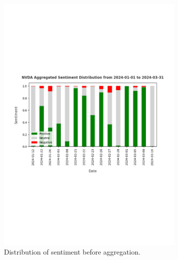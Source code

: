 \begin{figure}[htbp]
    \centering
    \begin{subfigure}{0.8\textwidth}
        \centering
        \includegraphics[width=\textwidth]{img/experiment-stock/nvda-preaggregated-a.pdf}
        \caption{Distribution of sentiment before aggregation.}
        \label{fig:elsa-experiment-stock-nvda-preaggregated}
    \end{subfigure}
    \hfill
    \begin{subfigure}{0.8\textwidth}
        \centering

\end{subfigure}
\end{figure}

